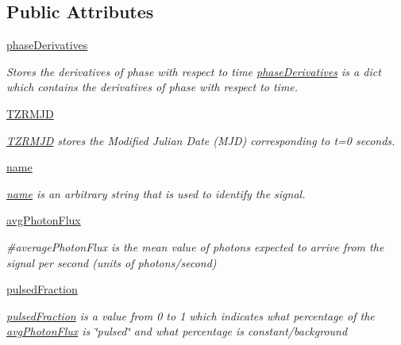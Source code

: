 \subsection*{Public Attributes}
\begin{DoxyCompactItemize}
\item 
\hyperlink{classmodest_1_1signals_1_1xraysource_1_1PeriodicXRaySource_ad885c269b3b042b3d094412683ef3476}{phase\+Derivatives}
\begin{DoxyCompactList}\small\item\em Stores the derivatives of phase with respect to time  \hyperlink{classmodest_1_1signals_1_1xraysource_1_1PeriodicXRaySource_ad885c269b3b042b3d094412683ef3476}{phase\+Derivatives} is a dict which contains the derivatives of phase with respect to time. \end{DoxyCompactList}\item 
\hyperlink{classmodest_1_1signals_1_1xraysource_1_1PeriodicXRaySource_aecd53533d34a4f821f4010c197edc2e8}{T\+Z\+R\+M\+JD}
\begin{DoxyCompactList}\small\item\em \hyperlink{classmodest_1_1signals_1_1xraysource_1_1PeriodicXRaySource_aecd53533d34a4f821f4010c197edc2e8}{T\+Z\+R\+M\+JD} stores the Modified Julian Date (M\+JD) corresponding to t=0 seconds. \end{DoxyCompactList}\item 
\hyperlink{classmodest_1_1signals_1_1xraysource_1_1PeriodicXRaySource_aac8308319d4f31067e1087660a15db03}{name}
\begin{DoxyCompactList}\small\item\em \hyperlink{classmodest_1_1signals_1_1xraysource_1_1PeriodicXRaySource_aac8308319d4f31067e1087660a15db03}{name} is an arbitrary string that is used to identify the signal. \end{DoxyCompactList}\item 
\hyperlink{classmodest_1_1signals_1_1xraysource_1_1PeriodicXRaySource_ac227ebef6424695360f2771765b4a4a7}{avg\+Photon\+Flux}
\begin{DoxyCompactList}\small\item\em \#average\+Photon\+Flux is the mean value of photons expected to arrive from the signal per second (units of photons/second) \end{DoxyCompactList}\item 
\hyperlink{classmodest_1_1signals_1_1xraysource_1_1PeriodicXRaySource_a5f968d9c80e5315d1657eac2ffca4e73}{pulsed\+Fraction}
\begin{DoxyCompactList}\small\item\em \hyperlink{classmodest_1_1signals_1_1xraysource_1_1PeriodicXRaySource_a5f968d9c80e5315d1657eac2ffca4e73}{pulsed\+Fraction} is a value from 0 to 1 which indicates what percentage of the \hyperlink{classmodest_1_1signals_1_1xraysource_1_1PeriodicXRaySource_ac227ebef6424695360f2771765b4a4a7}{avg\+Photon\+Flux} is \char`\"{}pulsed\char`\"{} and what percentage is constant/background \end{DoxyCompactList}\item 

\end{DoxyCompactItemize}

